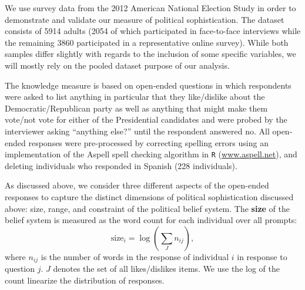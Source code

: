 \documentclass[12pt]{article}
\begin{document}
We use survey data from the 2012 American National Election Study in order to demonstrate and validate  our measure of political sophistication. The dataset consists of 5914 adults (2054 of which participated in face-to-face interviews while the remaining 3860 participated in a representative online survey). While both samples differ slightly with regards to the inclusion of some specific variables, we will mostly rely on the pooled dataset purpose of our analysis.

The knowledge measure is based on open-ended questions in which respondents were asked to list anything in particular that they like/dislike about the Democratic/Republican party as well as anything that might make them vote/not vote for either of the Presidential candidates and were probed by the interviewer asking ``anything else?'' until the respondent answered no. All open-ended responses were pre-processed by correcting spelling errors using an implementation of the Aspell spell checking algorithm in \texttt{R} (\url{www.aspell.net}), and deleting individuals who responded in Spanish (228 individuals). 

As discussed above, we consider three different aspects of the open-ended responses to capture the distinct dimensions of political sophistication discussed above: size, range, and constraint of the political belief system. The \textbf{size} of the belief system is measured as the word count for each individual over all prompts:
\begin{equation}
\text{size}_i = \log\left(\sum_J n_{ij}\right),
\end{equation}
where $n_{ij}$ is the number of words in the response of individual $i$ in response to question $j$. $J$ denotes the set of all likes/dislikes items. We use the log of the count linearize the distribution of responses.
\end{document}
